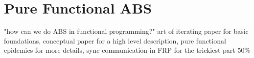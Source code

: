 \chapter{Pure Functional ABS}
"how can we do ABS in functional programming?" art of iterating paper for basic foundations, conceptual paper for a high level description, pure functional epidemics for more details, sync communication in FRP for the trickiest part
50\%
